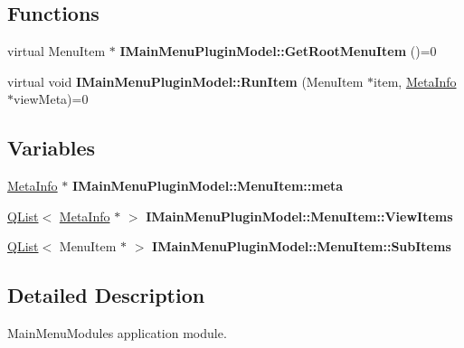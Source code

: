 \subsection*{Functions}
\begin{DoxyCompactItemize}
\item 
virtual Menu\+Item $\ast$ {\bfseries I\+Main\+Menu\+Plugin\+Model\+::\+Get\+Root\+Menu\+Item} ()=0\hypertarget{group___main_menu_module_ga61477b16187bfdc4ef7c3ccd72d2c09d}{}\label{group___main_menu_module_ga61477b16187bfdc4ef7c3ccd72d2c09d}

\item 
virtual void {\bfseries I\+Main\+Menu\+Plugin\+Model\+::\+Run\+Item} (Menu\+Item $\ast$item, \hyperlink{struct_meta_info}{Meta\+Info} $\ast$view\+Meta)=0\hypertarget{group___main_menu_module_ga45021f95c0dc5e75e938848d32053f92}{}\label{group___main_menu_module_ga45021f95c0dc5e75e938848d32053f92}

\end{DoxyCompactItemize}
\subsection*{Variables}
\begin{DoxyCompactItemize}
\item 
\hyperlink{struct_meta_info}{Meta\+Info} $\ast$ {\bfseries I\+Main\+Menu\+Plugin\+Model\+::\+Menu\+Item\+::meta}\hypertarget{group___main_menu_module_ga1750991191ace60981315c7095723346}{}\label{group___main_menu_module_ga1750991191ace60981315c7095723346}

\item 
\hyperlink{class_q_list}{Q\+List}$<$ \hyperlink{struct_meta_info}{Meta\+Info} $\ast$ $>$ {\bfseries I\+Main\+Menu\+Plugin\+Model\+::\+Menu\+Item\+::\+View\+Items}\hypertarget{group___main_menu_module_ga5576d4664cf1e226fbbbd5875239e0ae}{}\label{group___main_menu_module_ga5576d4664cf1e226fbbbd5875239e0ae}

\item 
\hyperlink{class_q_list}{Q\+List}$<$ Menu\+Item $\ast$ $>$ {\bfseries I\+Main\+Menu\+Plugin\+Model\+::\+Menu\+Item\+::\+Sub\+Items}\hypertarget{group___main_menu_module_ga945944fea3f6fe92c7fdec32bee522a8}{}\label{group___main_menu_module_ga945944fea3f6fe92c7fdec32bee522a8}

\end{DoxyCompactItemize}


\subsection{Detailed Description}
Main\+Menu\+Modules application module. 



